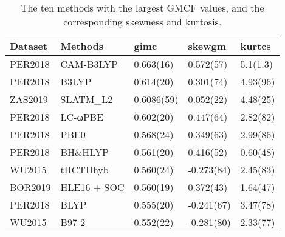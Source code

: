 \begin{table}[ht]
\centering
\begin{tabular}{lllll}
  \hline
Dataset & Methods & gimc & skewgm & kurtcs \\ 
  \hline
PER2018 & CAM-B3LYP & 0.663(16) & 0.572(57) & 5.1(1.3) \\ 
  PER2018 & B3LYP & 0.614(20) & 0.301(74) & 4.93(96) \\ 
  ZAS2019 & SLATM\_L2 & 0.6086(59) & 0.052(22) & 4.48(25) \\ 
  PER2018 & LC-ωPBE & 0.602(20) & 0.447(64) & 2.82(82) \\ 
  PER2018 & PBE0 & 0.568(24) & 0.349(63) & 2.99(86) \\ 
  PER2018 & BH\&HLYP & 0.561(20) & 0.416(52) & 0.60(48) \\ 
  WU2015 & tHCTHhyb & 0.560(24) & -0.273(84) & 2.45(83) \\ 
  BOR2019 & HLE16 + SOC & 0.560(19) & 0.372(43) & 1.64(47) \\ 
  PER2018 & BLYP & 0.555(20) & -0.241(67) & 3.47(78) \\ 
  WU2015 & B97-2 & 0.552(22) & -0.281(80) & 2.33(77) \\ 
   \hline
\end{tabular}
\caption{The ten methods with the largest GMCF values, 
               and the corresponding skewness and kurtosis.} 
\label{tab:statsLit}
\end{table}
